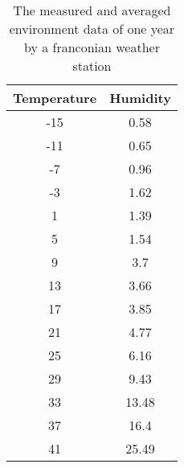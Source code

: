 \begin{table}[h!]
\centering
\begin{tabular}
{| c | c |}
\hline
 Temperature & Humidity \\ 
\hline
 -15 & 0.58 \\ 
\hline
 -11 & 0.65 \\ 
\hline
 -7 & 0.96 \\ 
\hline
 -3 & 1.62 \\ 
\hline
 1 & 1.39 \\ 
\hline
 5 & 1.54 \\ 
\hline
 9 & 3.7 \\ 
\hline
 13 & 3.66 \\ 
\hline
 17 & 3.85 \\ 
\hline
 21 & 4.77 \\ 
\hline
 25 & 6.16 \\ 
\hline
 29 & 9.43 \\ 
\hline
 33 & 13.48 \\ 
\hline
 37 & 16.4 \\ 
\hline
 41 & 25.49 \\ 
\hline
\end{tabular}
\label{EnvironmentData}
\caption{The measured and averaged environment data of one year by a franconian weather station}
\end{table}
